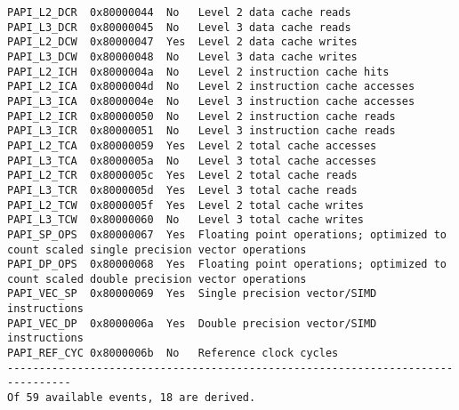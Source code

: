 \begin{verbatim}
PAPI_L2_DCR  0x80000044  No   Level 2 data cache reads
PAPI_L3_DCR  0x80000045  No   Level 3 data cache reads
PAPI_L2_DCW  0x80000047  Yes  Level 2 data cache writes
PAPI_L3_DCW  0x80000048  No   Level 3 data cache writes
PAPI_L2_ICH  0x8000004a  No   Level 2 instruction cache hits
PAPI_L2_ICA  0x8000004d  No   Level 2 instruction cache accesses
PAPI_L3_ICA  0x8000004e  No   Level 3 instruction cache accesses
PAPI_L2_ICR  0x80000050  No   Level 2 instruction cache reads
PAPI_L3_ICR  0x80000051  No   Level 3 instruction cache reads
PAPI_L2_TCA  0x80000059  Yes  Level 2 total cache accesses
PAPI_L3_TCA  0x8000005a  No   Level 3 total cache accesses
PAPI_L2_TCR  0x8000005c  Yes  Level 2 total cache reads
PAPI_L3_TCR  0x8000005d  Yes  Level 3 total cache reads
PAPI_L2_TCW  0x8000005f  Yes  Level 2 total cache writes
PAPI_L3_TCW  0x80000060  No   Level 3 total cache writes
PAPI_SP_OPS  0x80000067  Yes  Floating point operations; optimized to count scaled single precision vector operations
PAPI_DP_OPS  0x80000068  Yes  Floating point operations; optimized to count scaled double precision vector operations
PAPI_VEC_SP  0x80000069  Yes  Single precision vector/SIMD instructions
PAPI_VEC_DP  0x8000006a  Yes  Double precision vector/SIMD instructions
PAPI_REF_CYC 0x8000006b  No   Reference clock cycles
--------------------------------------------------------------------------------
Of 59 available events, 18 are derived.
\end{verbatim}